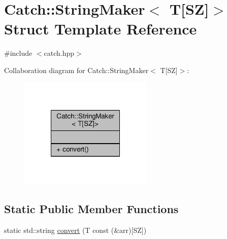\hypertarget{struct_catch_1_1_string_maker_3_01_t[_s_z]_4}{\section{Catch\-:\-:String\-Maker$<$ T\mbox{[}S\-Z\mbox{]}$>$ Struct Template Reference}
\label{struct_catch_1_1_string_maker_3_01_t[_s_z]_4}
}


{\ttfamily \#include $<$catch.\-hpp$>$}



Collaboration diagram for Catch\-:\-:String\-Maker$<$ T\mbox{[}S\-Z\mbox{]}$>$\-:
\nopagebreak
\begin{figure}[H]
\begin{center}
\leavevmode
\includegraphics[width=180pt]{struct_catch_1_1_string_maker_3_01_t[_s_z]_4__coll__graph}
\end{center}
\end{figure}
\subsection*{Static Public Member Functions}
\begin{DoxyCompactItemize}
\item 
static std\-::string \hyperlink{struct_catch_1_1_string_maker_3_01_t[_s_z]_4_ab10ef3c2111d6faa2ed2f23a1e00c29a}{convert} (T const (\&arr)\mbox{[}S\-Z\mbox{]})
\end{DoxyCompactItemize}


